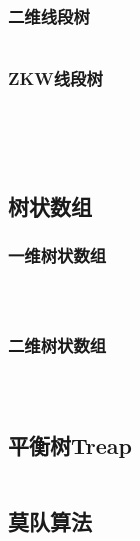 \documentclass[a4paper,11pt]{article}
\begin{document}
{\subsubsection{二维线段树} %
\inputminted[breaklines]{c++}{数据结构/线段树/二维线段树/单点修改&区间查询（最值&最大值）.cpp} %
\subsubsection{ZKW线段树} %
\inputminted[breaklines]{c++}{数据结构/线段树/ZKW线段树/开局.cpp} %
\inputminted[breaklines]{c++}{数据结构/线段树/ZKW线段树/单点修改+区间查询.cpp} %
\inputminted[breaklines]{c++}{数据结构/线段树/ZKW线段树/单点修改+区间查询最大子段和.cpp} %
\inputminted[breaklines]{c++}{数据结构/线段树/ZKW线段树/区间加减+单点查询.cpp} %
\inputminted[breaklines]{c++}{数据结构/线段树/ZKW线段树/区间加减+区间最值查询(lazy标记).cpp} %
\subsection{树状数组} %
\subsubsection{一维树状数组} %
\inputminted[breaklines]{c++}{数据结构/树状数组/一维树状数组/单点修改，区间查询.cpp} %
\inputminted[breaklines]{c++}{数据结构/树状数组/一维树状数组/区间修改，单点查询.cpp} %
\inputminted[breaklines]{c++}{数据结构/树状数组/一维树状数组/区间修改，区间查询.cpp} %
\subsubsection{二维树状数组} %
\inputminted[breaklines]{c++}{数据结构/树状数组/二维树状数组/单点修改，区间查询.cpp} %
\inputminted[breaklines]{c++}{数据结构/树状数组/二维树状数组/区间修改，单点查询.cpp} %
\inputminted[breaklines]{c++}{数据结构/树状数组/二维树状数组/区间修改，区间查询.cpp} %
\subsection{平衡树Treap} %
\inputminted[breaklines]{c++}{数据结构/平衡树Treap/普通平衡树Treap.cpp} %
\subsection{莫队算法} %
\inputminted[breaklines]{c++}{数据结构/莫队算法/回滚莫队.cpp} %
\inputminted[breaklines]{c++}{数据结构/莫队算法/区间查询，统计两个相同概率.cpp} %
\inputminted[breaklines]{c++}{数据结构/莫队算法/统计有多少个不同的数.cpp} %
\inputminted[breaklines]{c++}{数据结构/莫队算法/时间戳+统计有多少个不同的数.cpp} %
\inputminted[breaklines]{c++}{数据结构/莫队算法/树状数组维护区间两数之差.cpp} %

}
\end{document}
